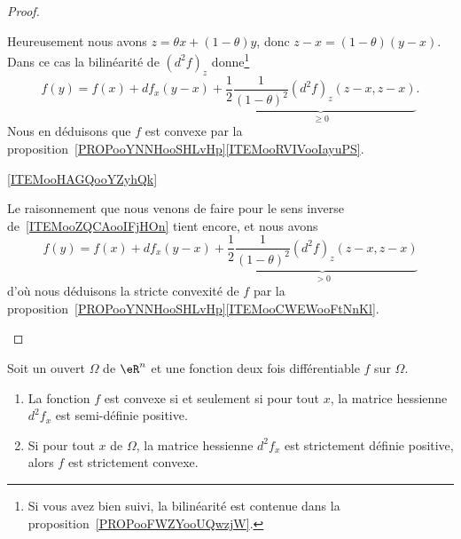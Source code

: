 \begin{proof}
\begin{subproof}
        Heureusement nous avons \( z=\theta x+(1-\theta)y\), donc \( z-x=(1-\theta)(y-x)\). Dans ce cas la bilinéarité de \( (d^2f)_z\) donne\footnote{Si vous avez bien suivi, la bilinéarité est contenue dans la proposition~\ref{PROPooFWZYooUQwzjW}.}
        \begin{equation}
            f(y)=f(x)+df_x(y-x)+\underbrace{\frac{ 1 }{2}\frac{1}{ (1-\theta)^2 }(d^2f)_z(z-x,z-x)}_{\geq 0}.
        \end{equation}
        Nous en déduisons que \( f\) est convexe par la proposition~\ref{PROPooYNNHooSHLvHp}\ref{ITEMooRVIVooIayuPS}.

    \item[\ref{ITEMooHAGQooYZyhQk}]

        Le raisonnement que nous venons de faire pour le sens inverse de~\ref{ITEMooZQCAooIFjHOn} tient encore, et nous avons
        \begin{equation}
            f(y)=f(x)+df_x(y-x)+\underbrace{\frac{ 1 }{2}\frac{1}{ (1-\theta)^2 }(d^2f)_z(z-x,z-x)}_{> 0}
        \end{equation}
        d'où nous déduisons la stricte convexité de \( f\) par la proposition~\ref{PROPooYNNHooSHLvHp}\ref{ITEMooCWEWooFtNnKl}.
    \end{subproof}
\end{proof}

\begin{corollary}       \label{CORooMBQMooWBAIIH}
    Soit un ouvert \( \Omega\) de \( \eR^n\) et une fonction deux fois différentiable \( f\) sur \( \Omega\).
    \begin{enumerate}
        \item   \label{ITEMooUAFTooXfCviI}
            La fonction \( f\) est convexe si et seulement si pour tout \( x\), la matrice hessienne \( d^2f_x\) est semi-définie positive.
        \item   \label{ITEMooDGISooPlRLOd}
            Si pour tout \( x\) de \( \Omega\), la matrice hessienne \( d^2f_x\) est strictement définie positive, alors \( f \) est strictement convexe.
    \end{enumerate}
\end{corollary}

